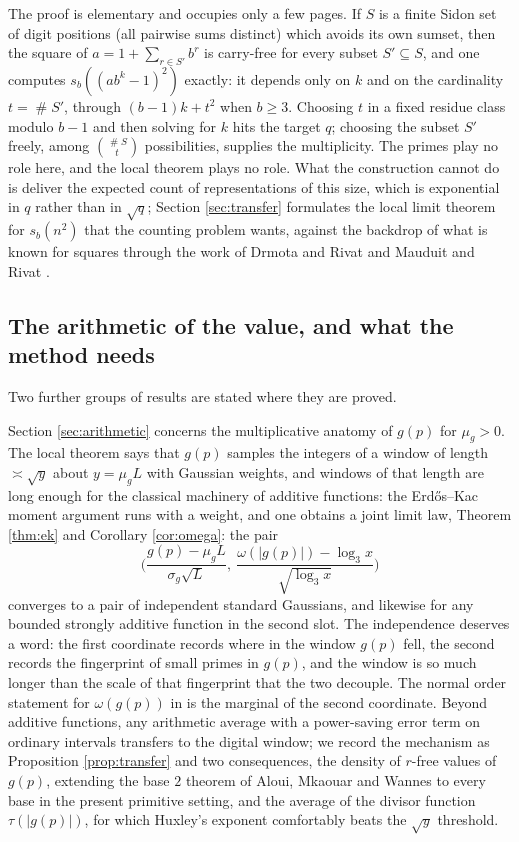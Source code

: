 \documentclass[11pt,reqno]{amsart}
\theoremstyle{plain}
\theoremstyle{definition}
\DeclareMathOperator{\Card}{\#}
\begin{document}
The proof is elementary and occupies only a few pages. If $S$ is a finite Sidon set of digit positions (all pairwise sums distinct) which avoids its own sumset, then the square of $a=1+\sum_{r\in S'}b^r$ is carry-free for every subset $S'\subseteq S$, and one computes $s_b((ab^k-1)^2)$ exactly: it depends only on $k$ and on the cardinality $t=\Card S'$, through $(b-1)k+t^2$ when $b\ge3$. Choosing $t$ in a fixed residue class modulo $b-1$ and then solving for $k$ hits the target $q$; choosing the subset $S'$ freely, among $\binom{\Card S}{t}$ possibilities, supplies the multiplicity. The primes play no role here, and the local theorem plays no role. What the construction cannot do is deliver the expected count of representations of this size, which is exponential in $q$ rather than in $\sqrt q$; Section \ref{sec:transfer} formulates the local limit theorem for $s_b(n^2)$ that the counting problem wants, against the backdrop of what is known for squares through the work of Drmota and Rivat \cite{drsquares} and Mauduit and Rivat \cite{mauduitrivat-squares}.

\subsection{The arithmetic of the value, and what the method needs}
Two further groups of results are stated where they are proved.

Section \ref{sec:arithmetic} concerns the multiplicative anatomy of $g(p)$ for $\mu_g>0$. The local theorem says that $g(p)$ samples the integers of a window of length $\asymp\sqrt y$ about $y=\mu_gL$ with Gaussian weights, and windows of that length are long enough for the classical machinery of additive functions: the Erd\H{o}s--Kac moment argument runs with a weight, and one obtains a joint limit law, Theorem \ref{thm:ek} and Corollary \ref{cor:omega}: the pair
\[
\Big(\frac{g(p)-\mu_gL}{\sigma_g\sqrt L},\ \frac{\omega(|g(p)|)-\log_3x}{\sqrt{\log_3x}}\Big)
\]
converges to a pair of independent standard Gaussians, and likewise for any bounded strongly additive function in the second slot. The independence deserves a word: the first coordinate records where in the window $g(p)$ fell, the second records the fingerprint of small primes in $g(p)$, and the window is so much longer than the scale of that fingerprint that the two decouple. The normal order statement for $\omega(g(p))$ in \cite{vibefrtz} is the marginal of the second coordinate. Beyond additive functions, any arithmetic average with a power-saving error term on ordinary intervals transfers to the digital window; we record the mechanism as Proposition \ref{prop:transfer} and two consequences, the density of $r$-free values of $g(p)$, extending the base $2$ theorem of Aloui, Mkaouar and Wannes \cite{aloui} to every base in the present primitive setting, and the average of the divisor function $\tau(|g(p)|)$, for which Huxley's exponent \cite{huxley} comfortably beats the $\sqrt y$ threshold.
\end{document}
